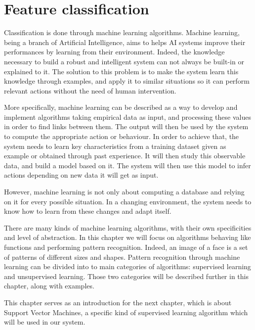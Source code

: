 \chapter{Feature classification}
\label{chap:classification}

\noindent Classification is done through machine learning algorithms. Machine learning, being a branch of Artificial Intelligence, aims to helps AI systems improve their performances by learning from their environment. Indeed, the knowledge necessary to build a robust and intelligent system can not always be built-in or explained to it. The solution to this problem is to make the system learn this knowledge through examples, and apply it to similar situations so it can perform relevant actions without the need of human intervention. 
\newline

\noindent More specifically, machine learning can be described as a way to develop and implement algorithms taking empirical data as input, and processing these values in order to find links between them. The output will then be used by the system to compute the appropriate action or behaviour. In order to achieve that, the system needs to learn key characteristics from a training dataset given as example or obtained through past experience. It will then study this observable data, and build a model based on it. The system will then use this model to infer actions depending on new data it will get as input.
\newline

\noindent However, machine learning is not only about computing a database and relying on it for every possible situation. In a changing environment, the system needs to know how to learn from these changes and adapt itself.
\newline

\noindent There are many kinds of machine learning algorithms, with their own specificities and level of abstraction. In this chapter we will focus on algorithms behaving like functions and performing pattern recognition. Indeed, an image of a face is a set of patterns of different sizes and shapes. Pattern recognition through machine learning can be divided into to main categories of algorithms: supervised learning and unsupervised learning. Those two categories will be described further in this chapter, along with examples.
\newline

\noindent This chapter serves as an introduction for the next chapter, which is about Support Vector Machines, a specific kind of supervised learning algorithm which will be used in our system.
\newline

